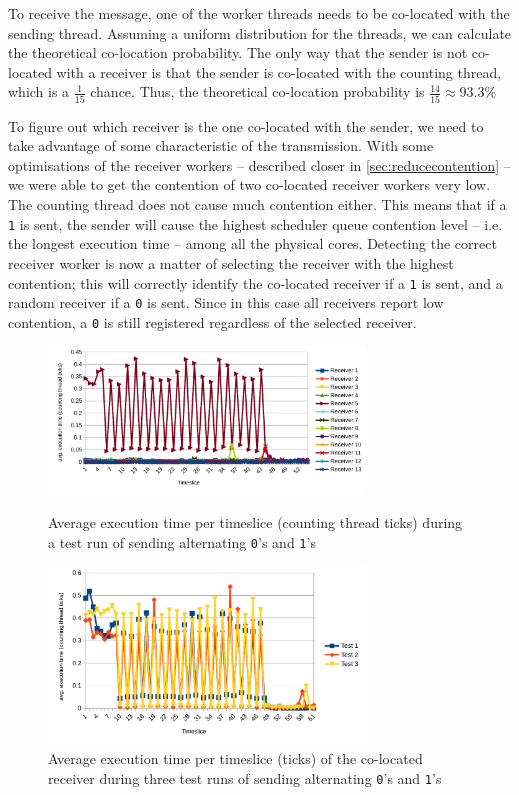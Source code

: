\documentclass[11pt,
  titlepage=false,
]{scrreprt}
\begin{document}
To receive the message, one of the worker threads needs to be co-located with the sending thread.
Assuming a uniform distribution for the threads, we can calculate the theoretical co-location probability.
The only way that the sender is not co-located with a receiver is that the sender is co-located with the counting thread,
which is a $\frac{1}{15}$ chance.
Thus, the theoretical co-location probability is $\frac{14}{15} \approx 93.3\%$

To figure out which receiver is the one co-located with the sender,
we need to take advantage of some characteristic of the transmission.
With some optimisations of the receiver workers -- described closer in \ref{sec:reducecontention} --
we were able to get the contention of two co-located receiver workers very low.
The counting thread does not cause much contention either.
This means that if a \texttt{1} is sent, the sender will cause the highest scheduler queue contention level -- i.e. the longest execution time --
among all the physical cores.
Detecting the correct receiver worker is now a matter of selecting the receiver with the highest contention;
this will correctly identify the co-located receiver if a \texttt{1} is sent, and a random receiver if a \texttt{0} is sent.
Since in this case all receivers report low contention, a \texttt{0} is still registered regardless of the selected receiver.

\begin{figure}
    \centering
    \includegraphics[width=0.75\textwidth]{figures/contentiontest}

    \caption{Average execution time per timeslice (counting thread ticks) during a test run of sending alternating \texttt{0}'s and \texttt{1}'s}
    \label{fig:contentiontest}
    \centering
    \includegraphics[width=0.75\textwidth]{figures/contentioncoalesced}

    \caption{Average execution time per timeslice (ticks) of the co-located receiver during three test runs of sending alternating \texttt{0}'s and \texttt{1}'s}
    \label{fig:contentioncoalesced}
\end{figure}
\end{document}
